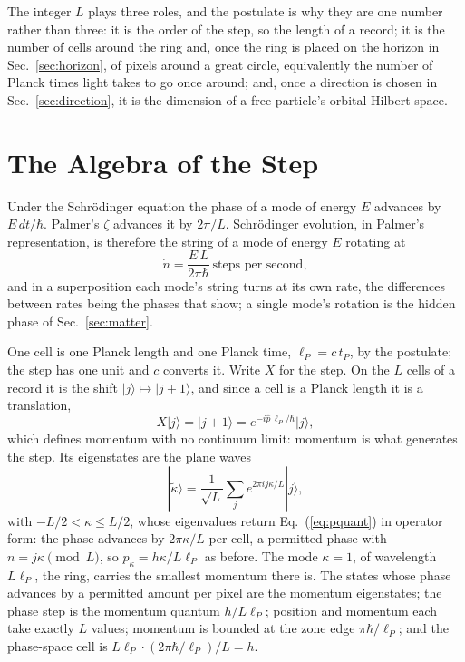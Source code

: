 \documentclass[aps,prd,twocolumn,superscriptaddress,nofootinbib]{revtex4-2}
\begin{document}
The integer $L$ plays three roles, and the postulate is why they are one number rather than three: it is the order of the step, so the length of a record; it is the number of cells around the ring and, once the ring is placed on the horizon in Sec.~\ref{sec:horizon}, of pixels around a great circle, equivalently the number of Planck times light takes to go once around; and, once a direction is chosen in Sec.~\ref{sec:direction}, it is the dimension of a free particle's orbital Hilbert space.

\section{The Algebra of the Step}
\label{sec:algebra}

Under the Schr\"odinger equation the phase of a mode of energy $E$ advances by $E\,dt/\hbar$. Palmer's $\zeta$ advances it by $2\pi/L$. Schr\"odinger evolution, in Palmer's representation, is therefore the string of a mode of energy $E$ rotating at
\begin{equation}
\dot n = \frac{E\,L}{2\pi\hbar}\ \text{steps per second} ,
\label{eq:rate}
\end{equation}
and in a superposition each mode's string turns at its own rate, the differences between rates being the phases that show; a single mode's rotation is the hidden phase of Sec.~\ref{sec:matter}.

One cell is one Planck length and one Planck time, $\ell_P = c\,t_P$, by the postulate; the step has one unit and $c$ converts it. Write $X$ for the step. On the $L$ cells of a record it is the shift $|j\rangle\mapsto|j+1\rangle$, and since a cell is a Planck length it is a translation,
\begin{equation}
X|j\rangle = |j+1\rangle = e^{-i\hat p\,\ell_P/\hbar}|j\rangle ,
\label{eq:X}
\end{equation}
which defines momentum with no continuum limit: momentum is what generates the step. Its eigenstates are the plane waves
\begin{equation}
|\tilde\kappa\rangle = \frac{1}{\sqrt L}\sum_j e^{2\pi i j\kappa/L}|j\rangle ,
\label{eq:pk}
\end{equation}
with $-L/2 < \kappa \le L/2$, whose eigenvalues return Eq.~(\ref{eq:pquant}) in operator form: the phase advances by $2\pi\kappa/L$ per cell, a permitted phase with $n = j\kappa \pmod L$, so $p_\kappa = h\kappa/L\ell_P$ as before. The mode $\kappa = 1$, of wavelength $L\ell_P$, the ring, carries the smallest momentum there is. The states whose phase advances by a permitted amount per pixel are the momentum eigenstates; the phase step is the momentum quantum $h/L\ell_P$; position and momentum each take exactly $L$ values; momentum is bounded at the zone edge $\pi\hbar/\ell_P$; and the phase-space cell is $L\ell_P\cdot(2\pi\hbar/\ell_P)/L = h$.
\end{document}
